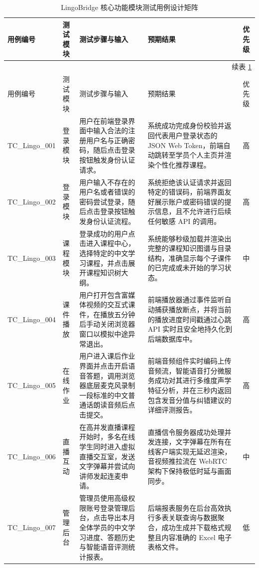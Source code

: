 \begin{longtable}{@{}p{2.2cm} p{1.6cm} p{4.6cm} p{4.6cm} p{1.2cm}@{}}
\caption{LingoBridge 核心功能模块测试用例设计矩阵} \label{tab:test-cases} \\
\toprule
用例编号 & 测试模块 & 测试步骤与输入 & 预期结果 & 优先级 \\
\midrule
\endfirsthead
\multicolumn{5}{r}{续表 \ref{tab:test-cases}} \\
\toprule
用例编号 & 测试模块 & 测试步骤与输入 & 预期结果 & 优先级 \\
\midrule
\endhead
\bottomrule
\endfoot
\bottomrule
\endlastfoot
TC\_Lingo\_001 & 登录模块 & 用户在前端登录界面中输入合法的注册用户名与正确密码，随后点击登录按钮触发身份认证请求。 & 系统成功完成身份校验并返回代表用户登录状态的 JSON Web Token，前端自动跳转至学员个人主页并渲染个性化推荐课程。 & 高 \\
\midrule
TC\_Lingo\_002 & 登录模块 & 用户输入不存在的用户名或者错误的密码尝试登录，随后点击登录按钮触发身份认证流程。 & 系统拒绝该认证请求并返回特定的错误码，前端界面友好展示账户或密码错误的提示信息，且不允许进行后续任何敏感 API 的调用。 & 高 \\
\midrule
TC\_Lingo\_003 & 课程模块 & 登录成功的用户点击进入课程中心，选择特定的中文学习课程，并点击展开课程知识树大纲。 & 系统能够秒级加载并渲染出完整的课程知识图谱与目录结构，准确显示每个子课件的已完成或未开始的学习状态。 & 中 \\
\midrule
TC\_Lingo\_004 & 课件播放 & 用户打开包含富媒体视频的交互式课件，在播放五分钟后手动关闭浏览器窗口以模拟中途异常退出。 & 前端播放器通过事件监听自动捕获播放断点，并将当前的播放进度时间戳通过心跳 API 实时且安全地持久化到后端数据库中。 & 高 \\
\midrule
TC\_Lingo\_005 & 在线作业 & 用户进入课后作业界面并点击开启语音答题，调用浏览器底层麦克风录制一段标准的中文普通话朗读音频后点击提交。 & 前端音频组件实时编码上传音频流，智能语音打分微服务成功对其进行多维度声学特征分析，并在三秒内返回包含发音分值与纠错建议的详细评测报告。 & 高 \\
\midrule
TC\_Lingo\_006 & 直播互动 & 在高并发直播课程开始时，多名在线学生同时进入虚拟直播交互室，发送文字弹幕并尝试向讲师发起连麦申请。 & 直播信令服务器成功处理并发连接，文字弹幕在所有在线客户端实现无延迟渲染，音视频推拉流在 WebRTC 架构下保持极低时延与画面同步。 & 中 \\
\midrule
TC\_Lingo\_007 & 管理后台 & 管理员使用高级权限账号登录管理后台，点击导出本月全体学员的中文学习进度、答题历史与智能语音评测统计报表。 & 后端报表服务在后台高效执行多表关联查询与数据聚合，成功生成并下载格式规整且内容准确的 Excel 电子表格文件。 & 低 \\
\bottomrule
\end{longtable}
